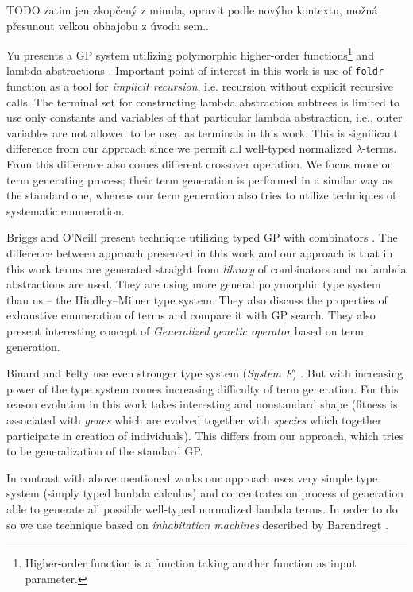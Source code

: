 \documentclass{sig-alternate}
\newcommand{\lterms}{$\lambda$-terms\xspace}
\newcommand{\red}[1]{{\color{red} #1}}
\begin{document}
\red{TODO zatim jen zkopčený z minula, opravit podle novýho kontextu,
možná přesunout velkou obhajobu z úvodu sem..}

Yu presents a GP system utilizing
polymorphic higher-order functions\footnote{Higher-order 
function is a function taking another function as 
input parameter.} and lambda abstractions  \cite{yu01}.
Important point of interest in this work is use of
\texttt{foldr} function as a tool for \textit{implicit recursion},
i.e. recursion without explicit recursive calls. 
The terminal set for constructing lambda abstraction subtrees 
is limited to use only constants and variables of that particular
lambda abstraction, i.e., outer variables are not allowed to be used
as terminals in this work. This is significant difference from our approach 
since we permit all well-typed normalized \lterms. From this difference also
comes different crossover operation. We focus more on term generating process; 
their term generation is performed in a similar way as the standard one, 
whereas our term generation also tries to utilize techniques of systematic enumeration. 

Briggs and O’Neill present technique 
utilizing typed GP with combinators \cite{kes}.
The difference between approach presented in this work
and our approach is that in this work terms are generated
straight from \textit{library} of combinators and no lambda abstractions
are used. They are using more general polymorphic type system than us
-- the Hindley–Milner type system. They also discuss the 
properties of exhaustive enumeration of terms and compare it with GP search.  
They also present interesting concept of \textit{Generalized
genetic operator} based on term generation. 

Binard and Felty use even 
stronger type system (\textit{System F}) \cite{binard2008genetic}.  
But with increasing power of the type system comes increasing difficulty of term generation.
For this reason evolution in this work takes interesting and nonstandard shape 
(fitness is associated with \textit{genes} which are evolved together with \textit{species}
which together participate in creation of individuals).
This differs from our approach, which tries to be generalization of
the standard GP\cite{koza92}.

In contrast with above mentioned works our approach uses very simple type system 
(simply typed lambda calculus) and concentrates on process of generation  
able to generate all possible well-typed normalized lambda terms. In order to do
so we use technique based on \textit{inhabitation machines} 
described by Barendregt \cite{barendregt10}.    
\end{document}
